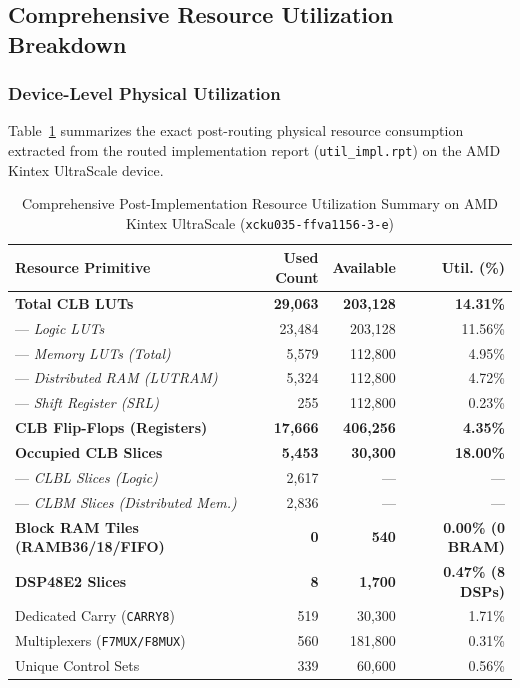 \subsection{Comprehensive Resource Utilization Breakdown}
\label{sec:results_utilization}

\subsubsection{Device-Level Physical Utilization}
Table~\ref{tab:device_utilization} summarizes the exact post-routing physical resource consumption extracted from the routed implementation report (\texttt{util\_impl.rpt}) on the AMD Kintex UltraScale device.

\begin{table}[htbp]
\caption{Comprehensive Post-Implementation Resource Utilization Summary on AMD Kintex UltraScale (\texttt{xcku035-ffva1156-3-e})}
\label{tab:device_utilization}
\centering
\scriptsize
\setlength{\tabcolsep}{2.0pt}
\begin{tabular}{lrrr}
\toprule
\textbf{Resource Primitive} & \textbf{Used Count} & \textbf{Available} & \textbf{Util. (\%)} \\
\midrule
\textbf{Total CLB LUTs} & \textbf{29,063} & \textbf{203,128} & \textbf{14.31\%} \\
--- \textit{Logic LUTs} & 23,484 & 203,128 & 11.56\% \\
--- \textit{Memory LUTs (Total)} & 5,579 & 112,800 & 4.95\% \\
\quad --- \textit{Distributed RAM (LUTRAM)} & 5,324 & 112,800 & 4.72\% \\
\quad --- \textit{Shift Register (SRL)} & 255 & 112,800 & 0.23\% \\
\textbf{CLB Flip-Flops (Registers)} & \textbf{17,666} & \textbf{406,256} & \textbf{4.35\%} \\
\textbf{Occupied CLB Slices} & \textbf{5,453} & \textbf{30,300} & \textbf{18.00\%} \\
--- \textit{CLBL Slices (Logic)} & 2,617 & --- & --- \\
--- \textit{CLBM Slices (Distributed Mem.)} & 2,836 & --- & --- \\
\textbf{Block RAM Tiles (RAMB36/18/FIFO)} & \textbf{0} & \textbf{540} & \textbf{0.00\% (0 BRAM)} \\
\textbf{DSP48E2 Slices} & \textbf{8} & \textbf{1,700} & \textbf{0.47\% (8 DSPs)} \\
Dedicated Carry (\texttt{CARRY8}) & 519 & 30,300 & 1.71\% \\
Multiplexers (\texttt{F7MUX/F8MUX}) & 560 & 181,800 & 0.31\% \\
Unique Control Sets & 339 & 60,600 & 0.56\% \\
\bottomrule
\end{tabular}
\end{table}

